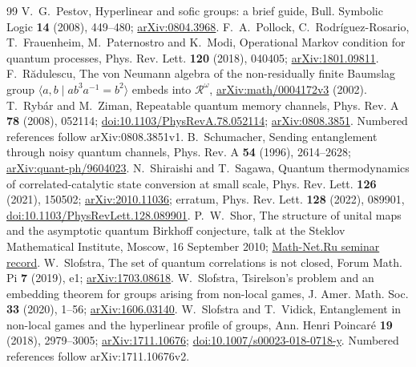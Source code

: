 \begin{thebibliography}{99}
 V.~G.~Pestov, Hyperlinear and sofic groups: a brief guide,
Bull. Symbolic Logic \textbf{14} (2008), 449--480; \href{https://arxiv.org/abs/0804.3968}{arXiv:0804.3968}.
 F.~A.~Pollock, C.~Rodr\'iguez-Rosario, T.~Frauenheim,
M.~Paternostro and K.~Modi, Operational Markov condition for quantum processes,
Phys. Rev. Lett. \textbf{120} (2018), 040405;
\href{https://arxiv.org/abs/1801.09811}{arXiv:1801.09811}.
 F.~R\u adulescu, The von Neumann algebra of the
non-residually finite Baumslag group $\langle a,b\mid ab^3a^{-1}=b^2\rangle$
embeds into $\mathcal R^\omega$,
\href{https://arxiv.org/abs/math/0004172v3}{arXiv:math/0004172v3} (2002).
 T.~Ryb\'ar and M.~Ziman, Repeatable quantum memory channels, Phys. Rev. A \textbf{78} (2008), 052114;
\href{https://doi.org/10.1103/PhysRevA.78.052114}{doi:10.1103/PhysRevA.78.052114}; \href{https://arxiv.org/abs/0808.3851}{arXiv:0808.3851}. Numbered references follow arXiv:0808.3851v1.
 B.~Schumacher, Sending entanglement through noisy quantum channels,
Phys. Rev. A \textbf{54} (1996), 2614--2628; \href{https://arxiv.org/abs/quant-ph/9604023}{arXiv:quant-ph/9604023}.
 N.~Shiraishi and T.~Sagawa,
Quantum thermodynamics of correlated-catalytic state conversion at small scale,
Phys. Rev. Lett. \textbf{126} (2021), 150502;
\href{https://arxiv.org/abs/2010.11036}{arXiv:2010.11036};
erratum, Phys. Rev. Lett. \textbf{128} (2022), 089901,
\href{https://doi.org/10.1103/PhysRevLett.128.089901}{doi:10.1103/PhysRevLett.128.089901}.
 P.~W.~Shor, The structure of unital maps and the asymptotic quantum Birkhoff conjecture,
talk at the Steklov Mathematical Institute, Moscow, 16 September 2010;
\href{https://www.mathnet.ru/php/seminars.phtml?option_lang=eng&presentid=1223}{Math-Net.Ru seminar record}.
 W.~Slofstra, The set of quantum correlations is not closed,
Forum Math. Pi \textbf{7} (2019), e1; \href{https://arxiv.org/abs/1703.08618}{arXiv:1703.08618}.
 W.~Slofstra, Tsirelson's problem and an embedding theorem for groups arising from non-local games,
J. Amer. Math. Soc. \textbf{33} (2020), 1--56; \href{https://arxiv.org/abs/1606.03140}{arXiv:1606.03140}.
 W.~Slofstra and T.~Vidick,
Entanglement in non-local games and the hyperlinear profile of groups,
Ann. Henri Poincar\'e \textbf{19} (2018), 2979--3005;
\href{https://arxiv.org/abs/1711.10676}{arXiv:1711.10676}; \href{https://doi.org/10.1007/s00023-018-0718-y}{doi:10.1007/s00023-018-0718-y}. Numbered references follow arXiv:1711.10676v2.

\end{thebibliography}
